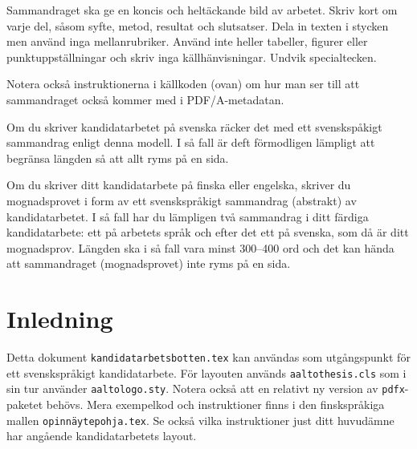 \documentclass[swedish, 12pt, a4paper, elec, utf8, a-2b, online]{aaltothesis}
\date{30.6.2025}
\begin{document}
	
\makecoverpage

\makecopyrightpage


\begin{abstractpage}[swedish]
Sammandraget ska ge en koncis och heltäckande bild av arbetet. Skriv kort
om varje del, såsom syfte, metod, resultat och slutsatser. Dela in texten i
stycken men använd inga mellanrubriker. Använd inte heller tabeller,
figurer eller punktuppställningar och skriv inga källhänvisningar. Undvik
specialtecken. 

Notera också instruktionerna i källkoden (ovan) om hur man ser till att
sammandraget också kommer med i PDF/A-metadatan.

Om du skriver kandidatarbetet på svenska räcker det med ett svenskspåkigt
sammandrag enligt denna modell. I så fall är deft förmodligen lämpligt att
begränsa längden så att allt ryms på en sida.

Om du skriver ditt kandidatarbete på finska eller engelska, skriver du
mognadsprovet i form av ett svenskspråkigt sammandrag (abstrakt) av
kandidatarbetet. I så fall har du lämpligen två sammandrag i ditt färdiga
kandidatarbete: ett på arbetets språk och efter det ett på svenska, som då
är ditt mognadsprov. Längden ska i så fall vara minst 300--400 ord och det
kan hända att sammandraget (mognadsprovet) inte ryms på en sida.

\end{abstractpage}




\clearpage
\thesistableofcontents


\clearpage
\section{Inledning}

Detta dokument \texttt{kandidatarbetsbotten.tex} kan användas som
utgångspunkt för ett svenskspråkigt kandidatarbete. För layouten används
\texttt{aaltothesis.cls} som i sin tur använder
\texttt{aaltologo.sty}. Notera också att en relativt ny version av
\texttt{pdfx}-paketet behövs. Mera exempelkod och instruktioner finns i den
finskspråkiga mallen \texttt{opinnäytepohja.tex}. Se också vilka
instruktioner just ditt huvudämne har angående kandidatarbetets layout.
\end{document}
